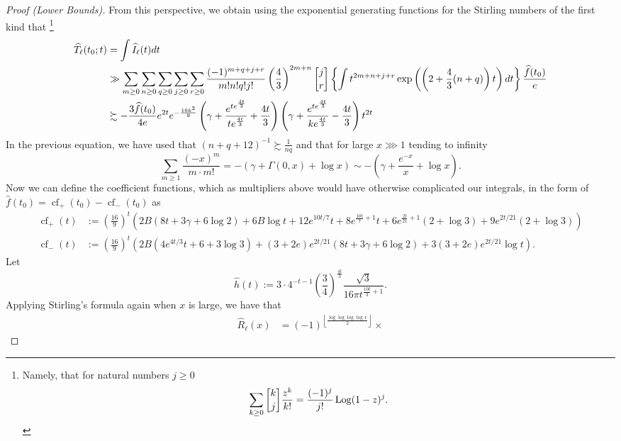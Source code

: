 \documentclass[11pt,reqno,a4letter]{article}
\numberwithin{figure}{section}
\numberwithin{table}{section}
\newcommand{\gkpSI}[2]{\ensuremath{\genfrac{\lbrack}{\rbrack}{0pt}{}{#1}{#2}}}
\newcommand{\Floor}[2]{\ensuremath{\left\lfloor \frac{#1}{#2} \right\rfloor}}
\theoremstyle{plain}
\numberwithin{theorem}{section}
\theoremstyle{definition}
\begin{document}
\begin{proof}[Proof (Lower Bounds)]
From this perspective, we obtain using the exponential generating functions for the 
Stirling numbers of the first kind that \cite[\S 7.4]{GKP}\footnote{ 
     Namely, that for natural numbers $j \geq 0$ 
     \[
     \sum_{k \geq 0} \gkpSI{k}{j} \frac{z^k}{k!} = \frac{(-1)^j}{j!} \operatorname{Log}(1-z)^j. 
     \]
} 
\begin{align*}
\widehat{T}_{\ell}(t_0; t) & = \int \widehat{I}_{\ell}(t) dt \\ 
     & \gg \sum_{m \geq 0} \sum_{n \geq 0} \sum_{q \geq 0} \sum_{j \geq 0} \sum_{r \geq 0} 
     \frac{(-1)^{m+q+j+r}}{m! n! q! j!} \left(\frac{4}{3}\right)^{2m+n} \gkpSI{j}{r} 
     \left\{\int 
     t^{2m+n+j+r} \exp\left(\left(2 + \frac{4}{3}(n+q)\right) t\right) dt 
     \right\} \frac{\widehat{f}(t_0)}{e} \\ 
     & \succsim 
     -\frac{3 \widehat{f}(t_0)}{4e} e^{2t} e^{-\frac{16 k^2}{9}} \left( 
     \gamma + \frac{e^{te^{\frac{4t}{3}}}}{t e^{\frac{4t}{3}}} + \frac{4t}{3}
     \right) \left(
     \gamma + \frac{e^{te^{\frac{4t}{3}}}}{k e^{\frac{4t}{3}}} - \frac{4t}{3} 
     \right) t^{2t} 
\end{align*} 
In the previous equation, we have used that $(n+q+12)^{-1} \succsim \frac{1}{nq}$ and that 
for large $x \ggg 1$ tending to infinity 
\[
\sum_{m \geq 1} \frac{(-x)^m}{m \cdot m!} = -\left(\gamma + \Gamma(0, x) + \log x\right) \sim 
     -\left(\gamma + \frac{e^{-x}}{x} + \log x\right). 
\]
Now we can define the coefficient functions, which as multipliers above 
would have otherwise complicated our integrals, 
in the form of $\widehat{f}(t_0) = \operatorname{cf}_{+}(t_0) - \operatorname{cf}_{-}(t_0)$ as 
\begin{align*}
\operatorname{cf}_{+}(t) & := \left(\frac{16}{9}\right)^t \left(2 B (8 t+3 \gamma +
     6 \log 2)+6 B \log t+12 e^{10 t/7} t+8 e^{\frac{10 t}{7}+1} t+6 e^{\frac{2 t}{21}+1}
     (2+\log 3)+9 e^{2 t/21} (2+\log 3)\right)\\ 
\operatorname{cf}_{-}(t) & := \left(\frac{16}{9}\right)^t \left(2 B \left(4 e^{4 t/3} t+6+3 
     \log 3\right)+(3+2 e) e^{2 t/21} (8 t+3 \gamma +6 \log 2)+3 (3+2 e) e^{2 t/21}
     \log t\right). 
\end{align*} 
Let 
\[
\widehat{h}(t) := 3 \cdot 4^{-t-1} \left(\frac{3}{4}\right)^{\frac{4t}{3}} \frac{\sqrt{3}}{ 
     16\pi t^{\frac{10t}{3}+1}}. 
\]
Applying Stirling's formula again when $x$ is large, we have that 
\begin{align} 
\label{proof_thm_GInvFunc_v2}  
\widehat{R}_{\ell}(x) & = (-1)^{\Floor{\log\log\log\log x}{2}} \times 

\end{align}
\end{proof}
\end{document}
